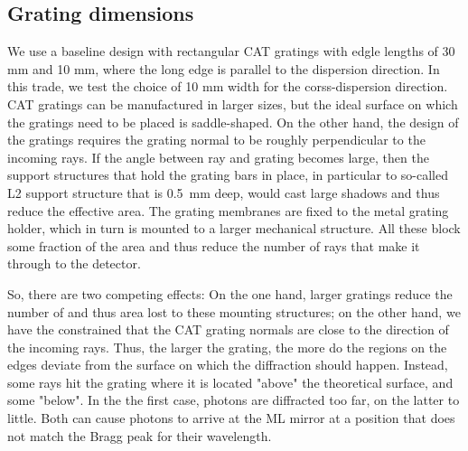 \documentclass[]{spie}  %
\begin{document}
\subsection{Grating dimensions}
We use a baseline design with rectangular CAT gratings with edgle
lengths of 30 mm and 10 mm, where the long edge is parallel to the
dispersion direction. In this trade, we test the choice of 10 mm width
for the corss-dispersion direction. CAT gratings can be manufactured
in larger sizes, but the ideal surface on which the gratings need to
be placed is saddle-shaped. On the other hand, the design of the
gratings requires the grating normal to be roughly perpendicular to
the incoming rays. If the angle between ray and grating becomes large,
then the support structures that hold the grating bars in place, in
particular to so-called L2 support structure that is 0.5~mm deep,
would cast large shadows and thus reduce the effective area. The
grating membranes are fixed to the metal grating holder, which in turn
is mounted to a larger mechanical structure. All these block some
fraction of the area and thus reduce the number of rays that make it
through to the detector.

So, there are two competing effects: On the one hand, larger gratings
reduce the number of and thus area lost to these mounting structures;
on the other hand, we have the constrained that the CAT grating
normals are close to the direction of the incoming rays. Thus, the
larger the grating, the more do the regions on the edges deviate from
the surface on which the diffraction should happen. Instead, some rays
hit the grating where it is located "above" the theoretical surface,
and some "below". In the the first case, photons are diffracted too
far, on the latter to little. Both can cause photons to arrive at the
ML mirror at a position that does not match the Bragg peak for their
wavelength.
\end{document}
